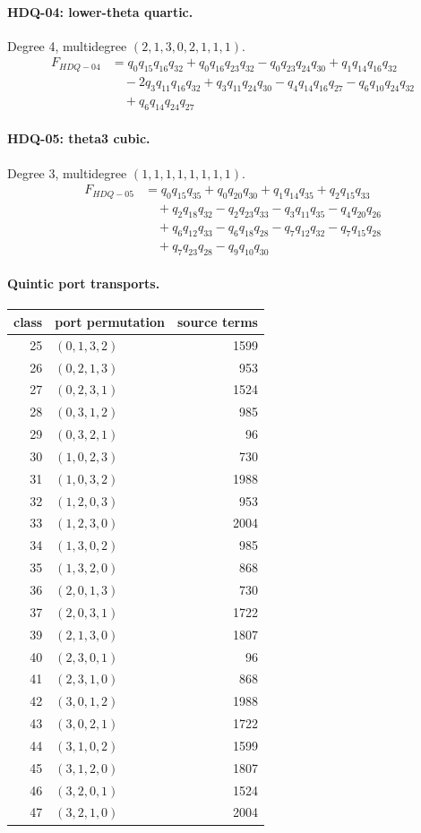\paragraph{HDQ-04: lower-theta quartic.} Degree 4, multidegree $(2,1,3,0,2,1,1,1)$.
\[\begin{aligned}F_{HDQ-04}&=q_{0}q_{15}q_{16}q_{32}+q_{0}q_{16}q_{23}q_{32}-q_{0}q_{23}q_{24}q_{30}+q_{1}q_{14}q_{16}q_{32}\\&\quad -2q_{3}q_{11}q_{16}q_{32}+q_{3}q_{11}q_{24}q_{30}-q_{4}q_{14}q_{16}q_{27}-q_{6}q_{10}q_{24}q_{32}\\&\quad +q_{6}q_{14}q_{24}q_{27}\end{aligned}\]
\paragraph{HDQ-05: theta3 cubic.} Degree 3, multidegree $(1,1,1,1,1,1,1,1)$.
\[\begin{aligned}F_{HDQ-05}&=q_{0}q_{15}q_{35}+q_{0}q_{20}q_{30}+q_{1}q_{14}q_{35}+q_{2}q_{15}q_{33}\\&\quad +q_{2}q_{18}q_{32}-q_{2}q_{23}q_{33}-q_{3}q_{11}q_{35}-q_{4}q_{20}q_{26}\\&\quad +q_{6}q_{12}q_{33}-q_{6}q_{18}q_{28}-q_{7}q_{12}q_{32}-q_{7}q_{15}q_{28}\\&\quad +q_{7}q_{23}q_{28}-q_{9}q_{10}q_{30}\end{aligned}\]

\paragraph{Quintic port transports.}
\begin{longtable}{r l r}
\toprule class & port permutation & source terms\\\midrule\endhead
25 & $(0,1,3,2)$ & 1599\\
26 & $(0,2,1,3)$ & 953\\
27 & $(0,2,3,1)$ & 1524\\
28 & $(0,3,1,2)$ & 985\\
29 & $(0,3,2,1)$ & 96\\
30 & $(1,0,2,3)$ & 730\\
31 & $(1,0,3,2)$ & 1988\\
32 & $(1,2,0,3)$ & 953\\
33 & $(1,2,3,0)$ & 2004\\
34 & $(1,3,0,2)$ & 985\\
35 & $(1,3,2,0)$ & 868\\
36 & $(2,0,1,3)$ & 730\\
37 & $(2,0,3,1)$ & 1722\\
39 & $(2,1,3,0)$ & 1807\\
40 & $(2,3,0,1)$ & 96\\
41 & $(2,3,1,0)$ & 868\\
42 & $(3,0,1,2)$ & 1988\\
43 & $(3,0,2,1)$ & 1722\\
44 & $(3,1,0,2)$ & 1599\\
45 & $(3,1,2,0)$ & 1807\\
46 & $(3,2,0,1)$ & 1524\\
47 & $(3,2,1,0)$ & 2004\\
\bottomrule
\end{longtable}
